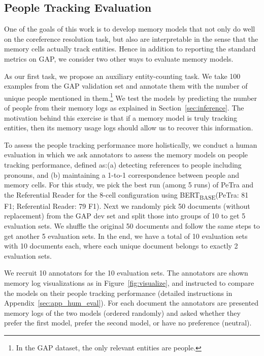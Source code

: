 \documentclass[11pt,a4paper]{article}
\newcommand{\bertbase}{BERT\textsubscript{BASE}\xspace}
\newcommand{\modelname}{PeTra\xspace}
\begin{document}
\subsection{People Tracking Evaluation}
\label{sec:exp_people_tracking_eval}
One of the goals of this work is to develop memory models that not only do well on the coreference resolution task, but also are interpretable in the sense that the memory cells actually track entities. Hence in addition to reporting the standard metrics on GAP, we consider two other ways to evaluate memory models. 

  As our first task, we propose an auxiliary entity-counting task. We take 100 examples from the GAP validation set and annotate them
with the number of unique people mentioned in them.\footnote{In the GAP dataset, the only relevant entities are people.}
We test the models by predicting the number of people from their memory logs as explained in Section~\ref{sec:inference}.
The motivation behind this exercise is that if a memory model is truly tracking entities, then its memory usage logs should allow us to recover  this information.

To assess the people tracking performance more holistically, we conduct a human evaluation in which we ask annotators to assess the memory models on people tracking performance, defined as:(a) detecting references to people including pronouns, and (b) maintaining a 1-to-1 correspondence between people and memory cells.
For this study, we pick the best run (among 5 runs) of \modelname and the Referential Reader for the 8-cell configuration using \bertbase (\modelname: 81 F1; Referential Reader: 79 F1).
Next we randomly pick 50 documents (without replacement) from the GAP dev set and split those into groups of 10 to get 5 evaluation sets.
We shuffle the original 50 documents and follow the same steps to get another 5 evaluation sets.
In the end, we have a total of 10 evaluation sets with 10 documents each, where each unique document belongs to exactly 2 evaluation sets.

We recruit 10 annotators for the 10 evaluation sets.
The annotators are shown memory log visualizations as in Figure~\ref{fig:visualize}, and instructed to compare the models on their people tracking performance (detailed instructions in Appendix~\ref{sec:app_hum_eval}). For each document the annotators are presented memory logs of the two models (ordered randomly) and asked whether they prefer the first model, prefer the second model, or have no preference
(neutral). 
\end{document}
